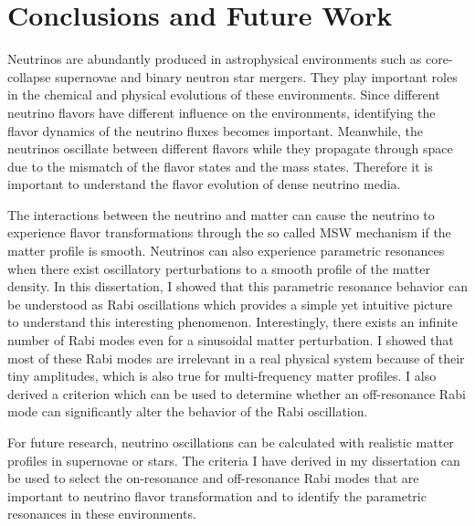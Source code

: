 \chapter{\label{chap:conclusion}Conclusions and Future Work}

Neutrinos are abundantly produced in astrophysical environments such as core-collapse supernovae and binary neutron star mergers. They play important roles in the chemical and physical evolutions of these environments. Since different neutrino flavors have different influence on the environments, identifying the flavor dynamics of the neutrino fluxes becomes important. Meanwhile, the neutrinos oscillate between different flavors while they propagate through space due to the mismatch of the flavor states and the mass states. Therefore it is important to understand the flavor evolution of dense neutrino media.

The interactions between the neutrino and matter can cause the neutrino to experience flavor transformations through the so called MSW mechanism if the matter profile is smooth. Neutrinos can also experience parametric resonances when there exist oscillatory perturbations to a smooth profile of the matter density. In this dissertation, I showed that this parametric resonance behavior can be understood as Rabi oscillations which provides a simple yet intuitive picture to understand this interesting phenomenon. Interestingly, there exists an infinite number of Rabi modes even for a sinusoidal matter perturbation. I showed that most of these Rabi modes are irrelevant in a real physical system because of their tiny amplitudes, which is also true for multi-frequency matter profiles. I also derived a criterion which can be used to determine whether an off-resonance Rabi mode can significantly alter the behavior of the Rabi oscillation.

For future research, neutrino oscillations can be calculated with realistic matter profiles in supernovae or stars. The criteria I have derived in my dissertation can be used to select the on-resonance and off-resonance Rabi modes that are important to neutrino flavor transformation and to identify the parametric resonances in these environments.

